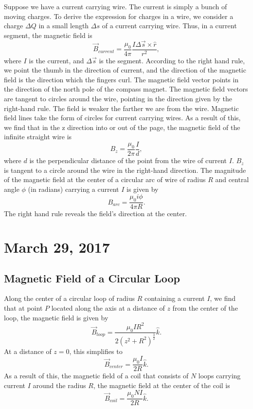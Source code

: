 \documentclass[11pt]{article}
\theoremstyle{plain} %
\theoremstyle{definition}
\theoremstyle{example}
\theoremstyle{remark}
\begin{document}
Suppose we have a current carrying wire. The current is simply a bunch of moving charges. To derive the expression for charges in a wire, we consider a charge $\Delta Q$ in a small length $\Delta s$ of a current carrying wire. Thus, in a current segment, the magnetic field is 
$$\vec{B}_{current} = \frac{\mu_0}{4\pi}\frac{I\Delta \vec{s} \times \hat{r}}{r^2},$$
where $I$ is the current, and $\Delta \vec{s}$ is the segment. According to the right hand rule, we point the thumb in the direction of current, and the direction of the magnetic field is the direction which the fingers curl. The magnetic field vector points in the direction of the north pole of the compass magnet. The magnetic field vectors are tangent to circles around the wire, pointing in the direction given by the right-hand rule. The field is weaker the farther we are from the wire. Magnetic field lines take the form of circles for current carrying wires. As a result of this, we find that in the z direction into or out of the page, the magnetic field of the infinite straight wire is 
$$B_z = \frac{\mu_0}{2\pi}\frac{I}{d},$$
where $d$ is the perpendicular distance of the point from the wire of current $I$. $B_z$ is tangent to a circle around the wire in the right-hand direction. The magnitude of the magnetic field at the center of a circular arc of wire of radius $R$ and central angle $\phi$ (in radians) carrying a current $I$ is given by 
$$B_{arc} =\frac{\mu_0i\phi}{4\pi R}.$$The right hand rule reveals the field's direction at the center. 


\section{March 29, 2017}
\subsection{Magnetic Field of a Circular Loop}
Along the center of a circular loop of radius $R$ containing a current $I$, we find that at point $P$ located along the axis at a distance of $z$ from the center of the loop, the magnetic field is given by 
$$\vec{B}_{loop} = \frac{\mu_0IR^2}{2\left(z^2+R^2\right)^{\frac{3}{2}}}\hat k.$$
At a distance of $z=0$, this simplifies to $$\vec{B}_{center} = \frac{\mu_0 I}{2R}\hat{k}.$$
As a result of this, the magnetic field of a coil that consists of $N$ loops carrying current $I$ around the radius $R$, the magnetic field at the center of the coil is
$$\vec{B}_{coil} = \frac{\mu_0N I}{2R}\hat{k}.$$
\end{document}
